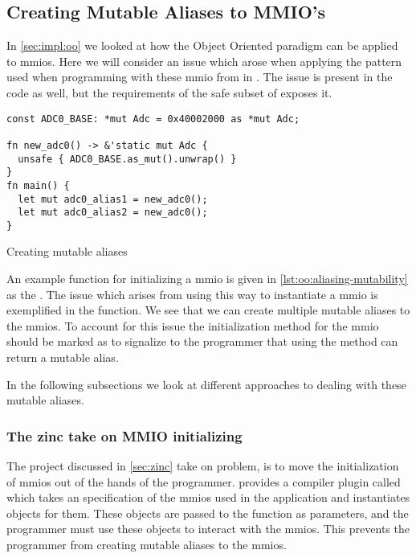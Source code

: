 \subsection{Creating Mutable Aliases to MMIO's}
\label{sec:res:aliasing-mmios}

In \autoref{sec:impl:oo} we looked at how the Object Oriented paradigm can be applied to \glspl{mmio}.
Here we will consider an issue which arose when applying the pattern used when programming with these \gls{mmio} from {\C} in {\rust}.
The issue is present in the {\C} code as well, but the requirements of the safe subset of {\rust} exposes it.

\begin{listing}[H]
  \begin{verbatim}
const ADC0_BASE: *mut Adc = 0x40002000 as *mut Adc;

fn new_adc0() -> &'static mut Adc {
  unsafe { ADC0_BASE.as_mut().unwrap() }
}
fn main() {
  let mut adc0_alias1 = new_adc0();
  let mut adc0_alias2 = new_adc0();
}
  \end{verbatim}
  \caption{Creating mutable aliases}
  \label{lst:oo:aliasing-mutability}
\end{listing}

An example function for initializing a \gls{mmio} is given in \autoref{lst:oo:aliasing-mutability} as the .
The issue which arises from using this way to instantiate a \gls{mmio} is exemplified in the {\main} function.
We see that we can create multiple mutable aliases to the \glspl{mmio}.
To account for this issue the initialization method for the \gls{mmio} should be marked as {\unsafe} to signalize to the programmer that using the method can return a mutable alias.

In the following subsections we look at different approaches to dealing with these mutable aliases.

\subsubsection{The zinc take on MMIO initializing}

The  project discussed in \autoref{sec:zinc} take on problem, is to move the initialization of \glspl{mmio} out of the hands of the programmer.
 provides a compiler plugin called  which takes an specification of the \glspl{mmio} used in the application and instantiates objects for them.
These objects are passed to the {\main} function as parameters, and the programmer must use these objects to interact with the \glspl{mmio}.
This prevents the programmer from creating mutable aliases to the \glspl{mmio}.

